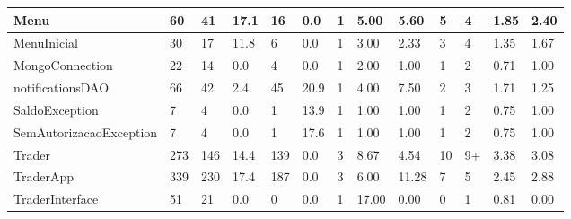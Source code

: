 \begin{table}[ht]
\begin{adjustbox}{width=1\textwidth}
\begin{tabular}{|l|l|l|l|l|l|l|l|l|l|l|l|l|}
Menu                         & 60           & 41         & 17.1            & 16       & 0.0            & 1       & 5.00            & 5.60                       & 5                   & 4                   & 1.85               & 2.40               \\ \hline
MenuInicial                  & 30           & 17         & 11.8            & 6        & 0.0            & 1       & 3.00            & 2.33                       & 3                   & 4                   & 1.35               & 1.67               \\ \hline
MongoConnection              & 22           & 14         & 0.0             & 4        & 0.0            & 1       & 2.00            & 1.00                       & 1                   & 2                   & 0.71               & 1.00               \\ \hline
notificationsDAO             & 66           & 42         & 2.4             & 45       & 20.9           & 1       & 4.00            & 7.50                       & 2                   & 3                   & 1.71               & 1.25               \\ \hline
SaldoException               & 7            & 4          & 0.0             & 1        & 13.9           & 1       & 1.00            & 1.00                       & 1                   & 2                   & 0.75               & 1.00               \\ \hline
SemAutorizacaoException      & 7            & 4          & 0.0             & 1        & 17.6           & 1       & 1.00            & 1.00                       & 1                   & 2                   & 0.75               & 1.00               \\ \hline
Trader                       & 273          & 146        & 14.4            & 139      & 0.0            & 3       & 8.67            & 4.54                       & 10                  & 9+                  & 3.38               & 3.08               \\ \hline
TraderApp                    & 339          & 230        & 17.4            & 187      & 0.0            & 3       & 6.00            & 11.28                      & 7                   & 5                   & 2.45               & 2.88               \\ \hline
TraderInterface              & 51           & 21         & 0.0             & 0        & 0.0            & 1       & 17.00           & 0.00                       & 0                   & 1                   & 0.81               & 0.00               \\ \hline

\end{tabular}
\end{adjustbox}
\end{table}
